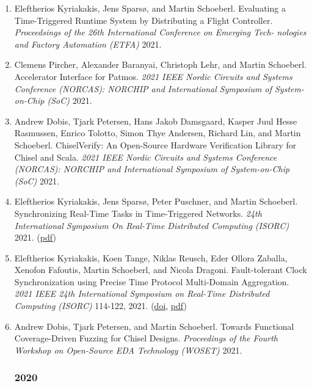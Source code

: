 \begin{enumerate}
\item Eleftherios Kyriakakis, Jens Spars{\o}, and Martin Schoeberl.
 Evaluating a Time-Triggered Runtime System by Distributing a Flight Controller.
 \emph{Proceedsings of the 26th International Conference on Emerging Tech- nologies and Factory Automation (ETFA)} 2021.


\item Clemens Pircher, Alexander Baranyai, Christoph Lehr, and Martin Schoeberl.
 Accelerator Interface for Patmos.
 \emph{2021 IEEE Nordic Circuits and Systems Conference (NORCAS): NORCHIP and International Symposium of System-on-Chip (SoC)} 2021.


\item Andrew Dobis, Tjark Petersen, Hans Jakob Damsgaard, Kasper Juul Hesse Rasmussen, Enrico Tolotto, Simon Thye Andersen, Richard Lin, and Martin Schoeberl.
 ChiselVerify: An Open-Source Hardware Verification Library for Chisel and Scala.
 \emph{2021 IEEE Nordic Circuits and Systems Conference (NORCAS): NORCHIP and International Symposium of System-on-Chip (SoC)} 2021.


\item Eleftherios Kyriakakis, Jens Spars{\o}, Peter Puschner, and Martin Schoeberl.
 Synchronizing Real-Time Tasks in Time-Triggered Networks.
 \emph{24th International Symposium On Real-Time Distributed Computing (ISORC)} 2021.
(\href{https://www.jopdesign.com/doc/ttetask.pdf}{pdf})

\item Eleftherios Kyriakakis, Koen Tange, Niklas Reusch, Eder Ollora Zaballa, Xenofon Fafoutis, Martin Schoeberl, and Nicola Dragoni.
 Fault-tolerant Clock Synchronization using Precise Time Protocol Multi-Domain Aggregation.
 \emph{2021 IEEE 24th International Symposium on Real-Time Distributed Computing (ISORC)} 114-122, 2021.
(\href{http://dx.doi.org/10.1109/ISORC52013.2021.00025}{doi}, \href{https://www.jopdesign.com/doc/Securing_the_Precise_Time_Protocol.pdf}{pdf})

\item Andrew Dobis, Tjark Petersen, and Martin Schoeberl.
 Towards Functional Coverage-Driven Fuzzing for Chisel Designs.
 \emph{Proceedings of the Fourth Workshop on Open-Source EDA Technology (WOSET)} 2021.



\subsubsection*{2020}


\end{enumerate}
